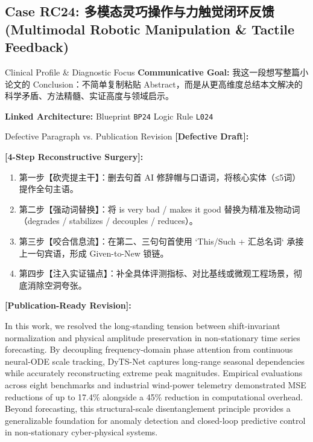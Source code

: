\subsection{Case RC24: 多模态灵巧操作与力触觉闭环反馈 (Multimodal Robotic Manipulation \& Tactile Feedback)}\label{case:RC24}
\begin{ConceptBox}{Clinical Profile \& Diagnostic Focus}
\textbf{Communicative Goal:} 我这一段想写整篇小论文的 Conclusion：不简单复制粘贴 Abstract，而是从更高维度总结本文解决的科学矛盾、方法精髓、实证高度与领域启示。\par
\textbf{Linked Architecture:} Blueprint \texttt{BP24} \enspace\textbar\enspace Logic Rule \texttt{L024}
\end{ConceptBox}
\begin{ExampleBox}{Defective Paragraph vs. Publication Revision}
\textbf{\color{TargetHighlight}[Defective Draft]:}\par
{}\par\vspace{6pt}
\textbf{\color{AcadForest}[4-Step Reconstructive Surgery]:}
\begin{enumerate}[label=\textbf{\color{AcadNavy}Step \arabic*:}, leftmargin=2em]
  \item 第一步【砍壳提主干】：删去句首 AI 修辞帽与口语词，将核心实体（≤5词）提作全句主语。
  \item 第二步【强动词替换】：将 is very bad / makes it good 替换为精准及物动词（degrades / stabilizes / decouples / reduces）。
  \item 第三步【咬合信息流】：在第二、三句句首使用 `This/Such + 汇总名词` 承接上一句宾语，形成 Given-to-New 锁链。
  \item 第四步【注入实证锚点】：补全具体评测指标、对比基线或微观工程场景，彻底消除空洞夸张。
\end{enumerate}\vspace{4pt}
\textbf{\color{AcadNavy}[Publication-Ready Revision]:}\par
In this work, we resolved the long-standing tension between shift-invariant normalization and physical amplitude preservation in non-stationary time series forecasting. By decoupling frequency-domain phase attention from continuous neural-ODE scale tracking, DyTS-Net captures long-range seasonal dependencies while accurately reconstructing extreme peak magnitudes. Empirical evaluations across eight benchmarks and industrial wind-power telemetry demonstrated MSE reductions of up to 17.4\% alongside a 45\% reduction in computational overhead. Beyond forecasting, this structural-scale disentanglement principle provides a generalizable foundation for anomaly detection and closed-loop predictive control in non-stationary cyber-physical systems.
\end{ExampleBox}
